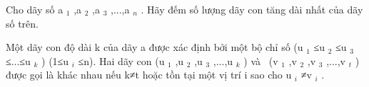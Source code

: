 Cho dãy số a   $_    1   $   ,a   $_    2   $   ,a   $_    3   $   ,...,a   $_    n   $   .  Hãy đếm số lượng dãy con tăng dài nhất của dãy số trên.  

   Một dãy  con độ dài k của dãy a được xác định bởi một bộ chỉ số (u   $_    1   $   ≤u   $_    2   $   ≤u   $_    3   $   ≤...≤u   $_    k   $   )  (1≤u   $_    i   $   ≤n). Hai dãy con (u   $_    1   $   ,u   $_    2   $   ,u   $_    3   $   ,...,u   $_    k   $   )  và  (v   $_    1   $   ,v   $_    2   $   ,v   $_    3   $   ,...,v   $_    t   $   ) được  gọi là khác nhau nếu k≠t hoặc tồn tại một vị trí i sao cho u   $_    i   $   ≠v   $_    i   $   .  

\